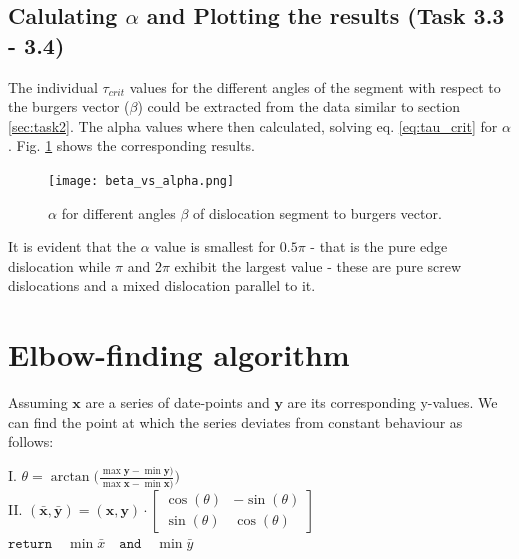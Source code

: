 \subsection{Calulating \(\alpha\) and Plotting the results (Task 3.3 - 3.4)}
The individual \(\tau_{crit}\) values for the different angles of the segment with respect to the burgers vector (\(\beta\)) could be extracted from the data similar to section \ref{sec:task2}. The alpha values where then calculated, solving eq. \ref{eq:tau_crit} for \(\alpha\). Fig. \ref{fig:beta_vs_alpha} shows the corresponding results.

\begin{figure}[htb]
	\centering
	\texttt{[image: beta\_vs\_alpha.png]}
	\caption{\(\alpha\) for different angles \(\beta\) of dislocation segment to burgers vector.}
	\label{fig:beta_vs_alpha}
\end{figure}

It is evident that the \(\alpha\) value is smallest for \(0.5 \pi\) - that is the pure edge dislocation while \(\pi\) and \(2 \pi\) exhibit the largest value - these are pure screw dislocations and a mixed dislocation parallel to it. 

\newpage

\appendix

\section{Elbow-finding algorithm} \label{sec:elbow_finding}

Assuming \(\mathbf{x}\) are a series of date-points and \(\mathbf{y}\) are its corresponding y-values. We can find the point at which the series deviates from constant behaviour as follows:

\begin{algorithm}
	I. \(\theta = \arctan \big(  \frac{\max \mathbf{y} - \min \mathbf{y}  )}{\max \mathbf{x} - \min \mathbf{x}  )}  \big) \) \\
	II. \( (\mathbf{\bar{x}}, \mathbf{\bar{y}}) = (\mathbf{x}, \mathbf{y}) \cdot \begin{bmatrix}
		\cos(\theta) &  -\sin(\theta) \\
	    \sin(\theta) &  \cos(\theta)
	\end{bmatrix} \) \\
	\(\mathtt{return} \quad \min\bar{x} \quad \mathtt{and} \quad \min\bar{y}  \) 
\end{algorithm}


\printbibliography


